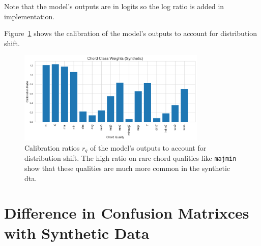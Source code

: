 Note that the model's outputs are in logits so the log ratio is added in implementation.

Figure~\ref{fig:calibration} shows the calibration of the model's outputs to account for distribution shift.

\begin{figure}[H]
    \centering
    \includegraphics[width=0.8\textwidth]{figures/calibration_ratios.png}
    \caption{Calibration ratios $r_q$ of the model's outputs to account for distribution shift. The high ratio on rare chord qualities like \texttt{majmin} show that these qualities are much more common in the synthetic dta.}\label{fig:calibration}
\end{figure}

\section{Difference in Confusion Matrixces with Synthetic Data}\label{app:cm_synthetic_data}

